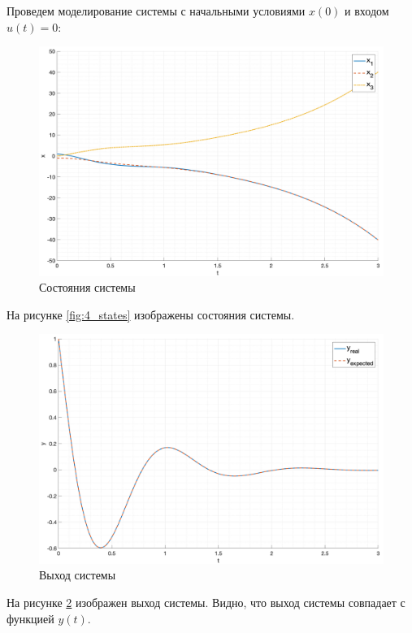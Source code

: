 Проведем моделирование системы с начальными условиями $x(0)$ и входом $u(t) = 0$: 
\begin{figure}
    \centering
    \includegraphics[width=\textwidth]{media/plots/task4_states.png}
    \caption{Состояния системы}
    \label{fig:task4_states}
\end{figure}
На рисунке \ref{fig:4_states} изображены состояния системы.
\begin{figure}
    \centering
    \includegraphics[width=\textwidth]{media/plots/task4_output.png}
    \caption{Выход системы}
    \label{fig:task4_output}
\end{figure}
На рисунке \ref{fig:task4_output} изображен выход системы. Видно, что выход системы совпадает с функцией $y(t)$.
